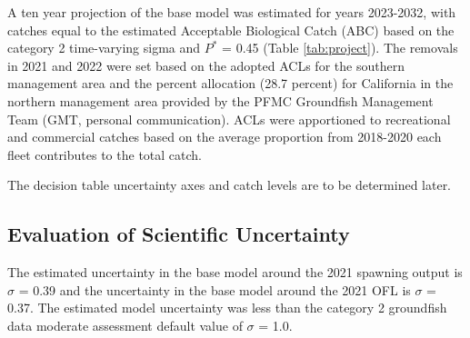 \documentclass[11pt,
  english,
  a4paper,
]{article}
\begin{document}
\leavevmode\tagmcend\tagstructend


A ten year projection of the base model was estimated for years 2023-2032, with catches equal to the estimated Acceptable Biological Catch (ABC) based on the category 2 time-varying sigma and {\(P^*\)\leavevmode\tagmcend\tagstructend} = 0.45 (Table \ref{tab:project}). The removals in 2021 and 2022 were set based on the adopted ACLs for the southern management area and the percent allocation (28.7 percent) for California in the northern management area provided by the PFMC Groundfish Management Team (GMT, personal communication). ACLs were apportioned to recreational and commercial catches based on the average proportion from 2018-2020 each fleet contributes to the total catch.

\leavevmode\tagmcend\tagstructend\par


The decision table uncertainty axes and catch levels are to be determined later.

\leavevmode\tagmcend\tagstructend\par


\hypertarget{evaluation-of-scientific-uncertainty}{%
\subsection{Evaluation of Scientific Uncertainty}\label{evaluation-of-scientific-uncertainty}}

\leavevmode\tagmcend\tagstructend


The estimated uncertainty in the base model around the 2021 spawning output is {\(\sigma\)\leavevmode\tagmcend\tagstructend} = 0.39 and the uncertainty in the base model around the 2021 OFL is {\(\sigma\)\leavevmode\tagmcend\tagstructend} = 0.37. The estimated model uncertainty was less than the category 2 groundfish data moderate assessment default value of {\(\sigma\)\leavevmode\tagmcend\tagstructend} = 1.0.

\leavevmode\tagmcend\tagstructend\par
\end{document}
